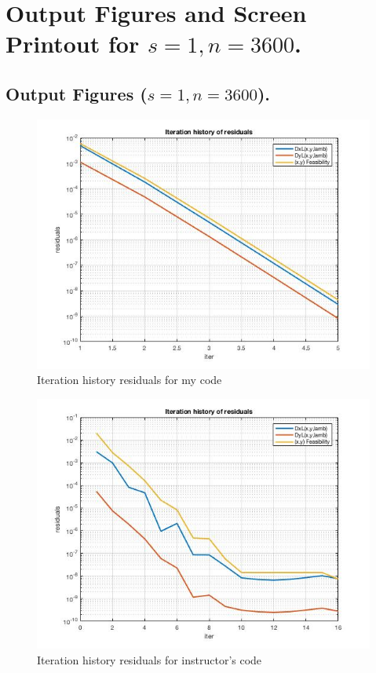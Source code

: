 \clearpage
\section{Output Figures and Screen Printout for $s=1,n=3600$.}
\subsection{Output Figures ($s=1,n=3600$).}
\begin{figure}[H]
\centering
\includegraphics[width=12cm]{F_2/F_1_2.jpg}
\caption{Iteration history residuals for my code}
\end{figure}
\begin{figure}[H]
\centering
\includegraphics[width=12cm]{F_2/F_1_3.jpg}
\caption{Iteration history residuals for instructor's code}
\end{figure}

